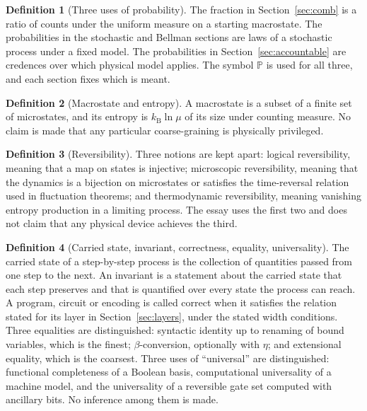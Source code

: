\documentclass[11pt]{article}
\theoremstyle{definition}
\newtheorem{definition}{Definition}
\theoremstyle{remark}
\renewcommand{\Pr}{\mathbb{P}}
\newcommand{\kB}{k_{\mathrm B}}
\begin{document}
\begin{definition}[Three uses of probability]\label{def:prob}
The fraction in Section~\ref{sec:comb} is a ratio of counts under the uniform measure on a starting macrostate. The probabilities in the stochastic and Bellman sections are laws of a stochastic process under a fixed model. The probabilities in Section~\ref{sec:accountable} are credences over which physical model applies. The symbol $\Pr$ is used for all three, and each section fixes which is meant.
\end{definition}

\begin{definition}[Macrostate and entropy]
A macrostate is a subset of a finite set of microstates, and its entropy is $\kB \ln \mu$ of its size under counting measure. No claim is made that any particular coarse-graining is physically privileged.
\end{definition}

\begin{definition}[Reversibility]
Three notions are kept apart: logical reversibility, meaning that a map on states is injective; microscopic reversibility, meaning that the dynamics is a bijection on microstates or satisfies the time-reversal relation used in fluctuation theorems; and thermodynamic reversibility, meaning vanishing entropy production in a limiting process. The essay uses the first two and does not claim that any physical device achieves the third.
\end{definition}

\begin{definition}[Carried state, invariant, correctness, equality, universality]
The carried state of a step-by-step process is the collection of quantities passed from one step to the next. An invariant is a statement about the carried state that each step preserves and that is quantified over every state the process can reach. A program, circuit or encoding is called correct when it satisfies the relation stated for its layer in Section~\ref{sec:layers}, under the stated width conditions. Three equalities are distinguished: syntactic identity up to renaming of bound variables, which is the finest; $\beta$-conversion, optionally with $\eta$; and extensional equality, which is the coarsest. Three uses of ``universal'' are distinguished: functional completeness of a Boolean basis, computational universality of a machine model, and the universality of a reversible gate set computed with ancillary bits. No inference among them is made.
\end{definition}
\end{document}
